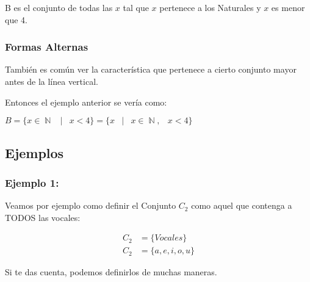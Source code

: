 \documentclass[12pt]{report}                                    %
\DeclareMathOperator \Space {\quad}                             %
\DeclareMathOperator \MiniSpace {\;}                            %
\newcommand \Such {\MiniSpace|\MiniSpace}                       %
\DeclareMathOperator \Naturals {\mathbb{N}}                     %
\begin{document}
                        B es el conjunto de todas las $x$ tal que $x$ pertenece a los Naturales
                        y $x$ es menor que 4.


                    \subsubsection*{Formas Alternas}
                    
                        También es común ver la característica que pertenece a cierto conjunto mayor
                        antes de la línea vertical.

                        Entonces el ejemplo anterior se vería como:

                        $B = \{ x \in \Naturals \Such x < 4 \} = \{ x \Such x \in \Naturals, \MiniSpace x < 4 \} $


                    
                \clearpage
                \subsection{Ejemplos} 

                \subsubsection*{Ejemplo 1:}

                    Veamos por ejemplo como definir el Conjunto $C_2$ como aquel que contenga a
                    TODOS las vocales:

                    \begin{equation*}   
                    \begin{split}   
                        C_2 &= \{ Vocales \}       \\
                        C_2 &= \{a, e, i, o, u \}
                    \end{split}   
                    \end{equation*}

                    Si te das cuenta, podemos definirlos de muchas maneras.


\end{document}
